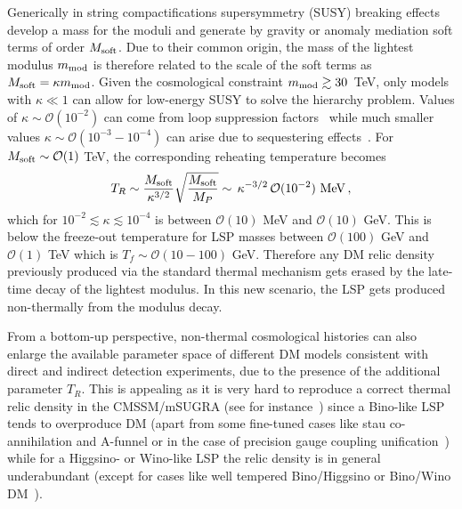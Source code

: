 \documentclass[11pt,a4paper]{article}
\newcommand{\be}{\begin{equation}}
\newcommand{\ee}{\end{equation}}
\newcommand{\mc}{\mathcal}
\begin{document}
Generically in string compactifications supersymmetry (SUSY) breaking effects develop a mass for the moduli
and generate by gravity or anomaly mediation soft terms of order $M_{\rm soft}$. Due to their common origin, the mass of the lightest modulus $m_{\rm mod}$
is therefore related to the scale of the soft terms as $M_{\rm soft} = \kappa m_{\rm mod}$.
Given the cosmological constraint $m_{\rm mod}\gtrsim 30$~TeV, only models with $\kappa\ll 1$ can allow for
low-energy SUSY to solve the hierarchy problem.
Values of $\kappa\sim\mc{O}(10^{-2})$ can come from loop suppression factors~\cite{Mirage,G2,Dudas:2012wi} while much smaller values $\kappa\sim\mc{O}(10^{-3}-10^{-4})$ can arise due to sequestering effects~\cite{seqLVS, Aparicio:2014wxa}. For $M_{\rm soft}\sim \mc{O}(1)$ TeV, the corresponding reheating temperature becomes
\be
T_R \sim  \frac{M_{\rm soft}}{\kappa^{3/2}} \sqrt{\frac{M_{\rm soft}}{M_P}} \sim \,\kappa^{-3/2}\,\mc{O}(10^{-2})\,\,{\rm MeV}\,,
\ee
which for $10^{-2}\lesssim\kappa\lesssim 10^{-4}$ is between $\mc{O}(10)$ MeV and $\mc{O}(10)$ GeV.
This is below the freeze-out temperature for LSP masses between $\mc{O}(100)$ GeV and $\mc{O}(1)$ TeV which is
$T_f \sim \mc{O}(10-100)$ GeV. Therefore any DM relic density previously produced via the standard thermal mechanism gets erased by the late-time decay of the lightest modulus. In this new scenario, the LSP gets produced non-thermally from the modulus decay.

From a bottom-up perspective, non-thermal cosmological histories can also enlarge the available parameter space of different DM models consistent with direct and indirect detection experiments, due to the presence of the additional parameter $T_R.$ This is appealing as it is very hard to reproduce a correct thermal relic density in the CMSSM/mSUGRA (see for instance~\cite{Baer:2012uya}) since a Bino-like LSP tends to overproduce DM
(apart from some fine-tuned cases like stau co-annihilation and A-funnel or in the case of precision gauge coupling unification~\cite{Krippendorf:2013dqa}) while for a Higgsino- or Wino-like LSP the relic density is in general underabundant (except for cases like well tempered Bino/Higgsino or Bino/Wino DM~\cite{ArkaniHamed:2006mb}).
\end{document}
